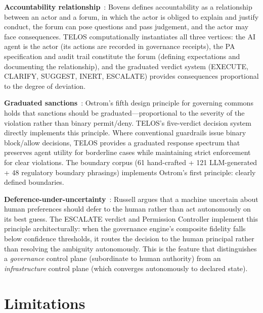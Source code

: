 \documentclass[11pt,twocolumn]{article}
\begin{document}
\textbf{Accountability relationship}~\citep{bovens2007analysing}: Bovens defines accountability as a relationship between an actor and a forum, in which the actor is obliged to explain and justify conduct, the forum can pose questions and pass judgement, and the actor may face consequences. TELOS computationally instantiates all three vertices: the AI agent is the actor (its actions are recorded in governance receipts), the PA specification and audit trail constitute the forum (defining expectations and documenting the relationship), and the graduated verdict system (EXECUTE, CLARIFY, SUGGEST, INERT, ESCALATE) provides consequences proportional to the degree of deviation.

\textbf{Graduated sanctions}~\citep{ostrom1990governing}: Ostrom's fifth design principle for governing commons holds that sanctions should be graduated---proportional to the severity of the violation rather than binary permit/deny. TELOS's five-verdict decision system directly implements this principle. Where conventional guardrails issue binary block/allow decisions, TELOS provides a graduated response spectrum that preserves agent utility for borderline cases while maintaining strict enforcement for clear violations. The boundary corpus (61 hand-crafted + 121 LLM-generated + 48 regulatory boundary phrasings) implements Ostrom's first principle: clearly defined boundaries.

\textbf{Deference-under-uncertainty}~\citep{russell2019human}: Russell argues that a machine uncertain about human preferences should defer to the human rather than act autonomously on its best guess. The ESCALATE verdict and Permission Controller implement this principle architecturally: when the governance engine's composite fidelity falls below confidence thresholds, it routes the decision to the human principal rather than resolving the ambiguity autonomously. This is the feature that distinguishes a \emph{governance} control plane (subordinate to human authority) from an \emph{infrastructure} control plane (which converges autonomously to declared state).

\section{Limitations}
\end{document}

